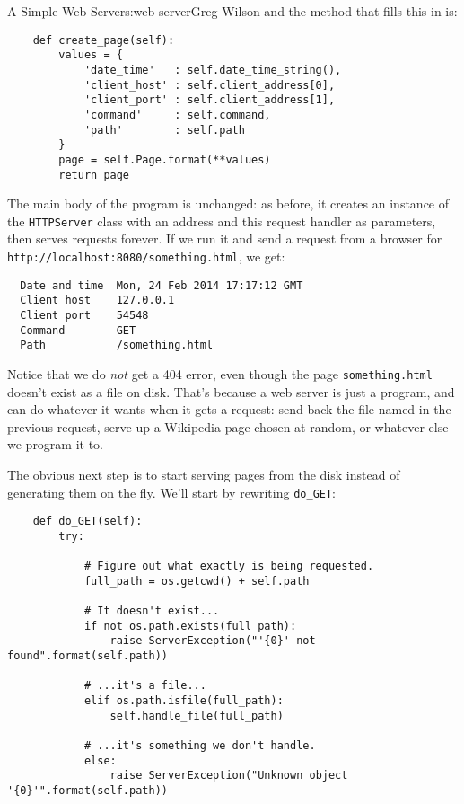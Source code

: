 \begin{aosachapter}{A Simple Web Server}{s:web-server}{Greg Wilson}
and the method that fills this in is:

\begin{verbatim}
    def create_page(self):
        values = {
            'date_time'   : self.date_time_string(),
            'client_host' : self.client_address[0],
            'client_port' : self.client_address[1],
            'command'     : self.command,
            'path'        : self.path
        }
        page = self.Page.format(**values)
        return page
\end{verbatim}

The main body of the program is unchanged: as before, it creates an
instance of the \texttt{HTTPServer} class with an address and this
request handler as parameters, then serves requests forever. If we run
it and send a request from a browser for
\texttt{http://localhost:8080/something.html}, we get:

\begin{verbatim}
  Date and time  Mon, 24 Feb 2014 17:17:12 GMT
  Client host    127.0.0.1
  Client port    54548
  Command        GET
  Path           /something.html
\end{verbatim}

Notice that we do \emph{not} get a 404 error, even though the page
\texttt{something.html} doesn't exist as a file on disk. That's because
a web server is just a program, and can do whatever it wants when it
gets a request: send back the file named in the previous request, serve
up a Wikipedia page chosen at random, or whatever else we program it to.

\label{serving-static-pages}

The obvious next step is to start serving pages from the disk instead of
generating them on the fly. We'll start by rewriting \texttt{do\_GET}:

\begin{verbatim}
    def do_GET(self):
        try:

            # Figure out what exactly is being requested.
            full_path = os.getcwd() + self.path

            # It doesn't exist...
            if not os.path.exists(full_path):
                raise ServerException("'{0}' not found".format(self.path))

            # ...it's a file...
            elif os.path.isfile(full_path):
                self.handle_file(full_path)

            # ...it's something we don't handle.
            else:
                raise ServerException("Unknown object '{0}'".format(self.path))


\end{verbatim}
\end{aosachapter}
